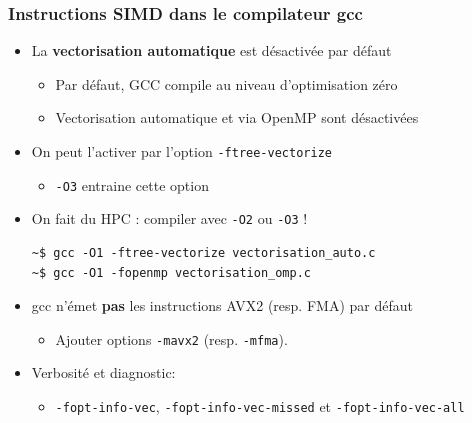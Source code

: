 \documentclass[xcolor={x11names,svgnames}]{beamer}
\begin{document}
\begin{frame}[fragile=singleslide]
  \frametitle{Instructions SIMD dans le compilateur gcc}

    \begin{itemize}
    \item La \textbf{vectorisation automatique} est désactivée par défaut 
      \begin{itemize}
      \item Par défaut, GCC compile au niveau d'optimisation zéro
      \item Vectorisation automatique et via OpenMP sont désactivées
      \end{itemize}

      \medskip
      
    \item On peut l'activer par l'option \verb|-ftree-vectorize|
      \begin{itemize}
      \item \verb|-O3| entraine cette option
      \end{itemize}
    \item On fait du HPC : compiler avec \verb|-O2| ou \verb|-O3| !
  \begin{verbatim}
~$ gcc -O1 -ftree-vectorize vectorisation_auto.c
~$ gcc -O1 -fopenmp vectorisation_omp.c
\end{verbatim}

\medskip
  
  \item gcc n'émet \textbf{pas} les instructions AVX2 (resp. FMA) par défaut
    \begin{itemize}
    \item Ajouter options \verb|-mavx2| (resp. \verb|-mfma|).
    \end{itemize}

\medskip

\item Verbosité et diagnostic:
  \begin{itemize}
  \item \scriptsize \verb|-fopt-info-vec|, \verb|-fopt-info-vec-missed| et \verb|-fopt-info-vec-all|
  \end{itemize}
  \end{itemize}

  

\end{frame}
\end{document}
